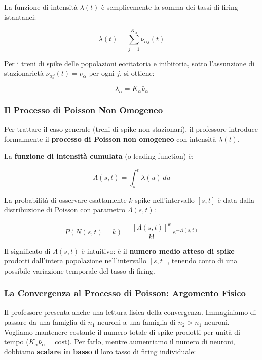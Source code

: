 La funzione di intensità $\lambda(t)$ è semplicemente la somma dei tassi di firing istantanei:

\begin{equation}
\lambda(t) = \sum_{j=1}^{K_\alpha} \nu_{\alpha j}(t)
\end{equation}

Per i treni di spike delle popolazioni eccitatoria e inibitoria, sotto l'assunzione di stazionarietà $\nu_{\alpha j}(t) = \bar{\nu}_\alpha$ per ogni $j$, si ottiene:

\begin{equation}
\lambda_\alpha = K_\alpha \bar{\nu}_\alpha
\end{equation}

\subsubsection{Il Processo di Poisson Non Omogeneo}

Per trattare il caso generale (treni di spike non stazionari), il professore introduce formalmente il \textbf{processo di Poisson non omogeneo} con intensità $\lambda(t)$.

La \textbf{funzione di intensità cumulata} (o leading function) è:

\begin{equation}
\Lambda(s, t) = \int_s^t \lambda(u)\, du
\end{equation}

La probabilità di osservare esattamente $k$ spike nell'intervallo $[s, t]$ è data dalla distribuzione di Poisson con parametro $\Lambda(s, t)$:

\begin{equation}
P(N(s,t) = k) = \frac{[\Lambda(s,t)]^k}{k!}\, e^{-\Lambda(s,t)}
\end{equation}

Il significato di $\Lambda(s, t)$ è intuitivo: è il \textbf{numero medio atteso di spike} prodotti dall'intera popolazione nell'intervallo $[s, t]$, tenendo conto di una possibile variazione temporale del tasso di firing.

\subsubsection{La Convergenza al Processo di Poisson: Argomento Fisico}

Il professore presenta anche una lettura fisica della convergenza. Immaginiamo di passare da una famiglia di $n_1$ neuroni a una famiglia di $n_2 > n_1$ neuroni. Vogliamo mantenere costante il numero totale di spike prodotti per unità di tempo ($K_\alpha \bar{\nu}_\alpha = \text{cost}$). Per farlo, mentre aumentiamo il numero di neuroni, dobbiamo \textbf{scalare in basso} il loro tasso di firing individuale:

